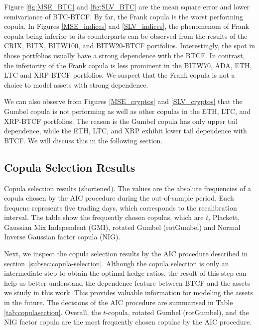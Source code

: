 
Figure \ref{fig:MSE_BTC} and \ref{fig:SLV_BTC} are the mean square
error and lower semivariance of BTC-BTCF. By far, the Frank copula
is the worst performing copula.
In Figures \ref{MSE_indices} and \ref{SLV_indices}, the phenomenom
of Frank copula being inferior to its counterparts can be observed
from the results of the CRIX, BITX, BITW100, and BITW20-BTCF
portfolios.
Interestingly, the spot in those portfolios usually have a strong
dependence with the BTCF.
In contrast, the inferiority of the Frank copula is less prominent in
the BITW70, ADA, ETH, LTC and XRP-BTCF portfolios.
We suspect that the Frank copula is not a choice to model assets with
strong dependence.

We can also observe from Figures \ref{MSE_cryptos} and
\ref{SLV_cryptos} that the Gumbel copula is not performing as well as
other copulas in the ETH, LTC, and XRP-BTCF portfolios.
The reason is the Gumbel copula has only upper tail dependence,
while the ETH, LTC, and XRP exhibit lower tail dependence with BTCF.
We will discuss this in the following section.

\subsection{Copula Selection Results}\label{subsec:-copula-results}
\begin{table}[t]

 \caption{Copula selection results (shortened).
        The values are the absolute frequencies of a copula chosen by
        the AIC procedure during the out-of-sample period. 
        Each frequenc represents five trading days, which corresponds
        to the recalibration interval.
        The table show the frequently chosen copulas, which are
        $t$, Plackett, Gaussian Mix Independent (GMI), rotated Gumbel
        (rotGumbel) and Normal Inverse Gaussian factor copula (NIG). 
        }
    \label{tab:copulasection}
\end{table}
Next, we inspect the copula selection results by the AIC procedure
described in section~\ref{subsec:copula-selection}. 
Although the copula selection is only an intermediate step to obtain
the optimal hedge ratios,
the result of this step can help us better understand the dependence
feature between BTCF and the assets we study in this work.
This provides valuable information for modeling the assets in the future.
The decisions of the AIC procedure are summarised in Table
\ref{tab:copulasection}. Overall, the $t$-copula, rotated Gumbel
(rotGumbel), and the NIG factor copula are the most frequently chosen
copulae by the AIC procedure.


